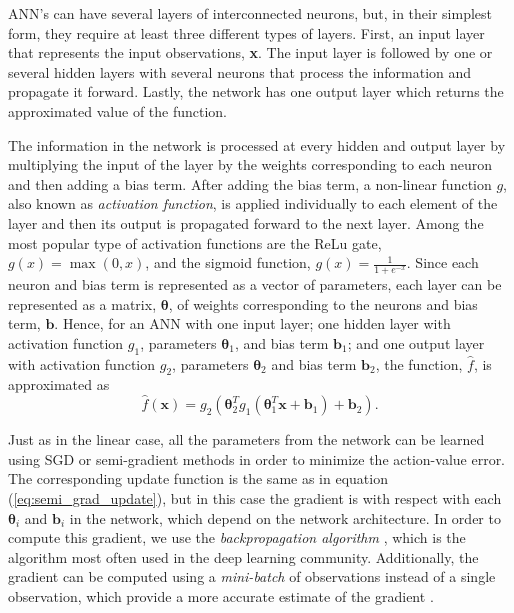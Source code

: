 ANN's can have several layers of interconnected neurons, but, in their simplest form, they require at least three different types of layers. 
First, an input layer that represents the input observations, \textbf{x}.
The input layer is followed by one or several hidden layers with several neurons that process the information and propagate it forward.
Lastly, the network has one output layer which returns the approximated value of the function.

The information in the network is processed at every hidden and output layer by multiplying the input of the layer by the weights corresponding to each neuron and then adding a bias term.
After adding the bias term, a non-linear function $g$, also known as \textit{activation function}, is applied individually to each element of the layer and then its output is propagated forward to the next layer.
Among the most popular type of activation functions are the ReLu gate, $g(x) = \max(0,x)$, and the sigmoid function, $g(x) = \frac{1}{1+e^{-x}}$. 
Since each neuron and bias term is represented as a vector of parameters, each layer can be represented as a matrix, $\boldsymbol\theta$, of weights corresponding to the neurons and bias term, $\textbf{b}$.
Hence, for an ANN with one input layer; one hidden layer with activation function $g_1$, parameters $\boldsymbol\theta_1$, and bias term $\textbf{b}_1$; and one output layer with activation function $g_2$, parameters $\boldsymbol\theta_2$ and bias term $\textbf{b}_2$, the function, $\hat{f}$, is approximated as
%
\begin{equation}
\label{eq:ann_example}
\hat{f}(\boldsymbol{x}) = 
	g_2(\boldsymbol\theta_2^T g_1( \boldsymbol\theta_1^T \boldsymbol{x} + \textbf{b}_1) + \textbf{b}_2).
\end{equation}
%

Just as in the linear case, all the parameters from the network can be learned using SGD or semi-gradient methods in order to minimize the action-value error.
The corresponding update function is the same as in equation (\ref{eq:semi_grad_update}), but in this case the gradient is with respect with each $\boldsymbol\theta_i$ and $\textbf{b}_i$ in the network, which depend on the network architecture.
In order to compute this gradient, we use the \textit{backpropagation algorithm} \parencite{Lecun1985,Rumelhart:1986}, which is the algorithm most often used in the deep learning community.
Additionally, the gradient can be computed using a \textit{mini-batch} of observations instead of a single observation, which provide a more accurate estimate of the gradient \parencite{Goodfellow-et-al-2016}. 

